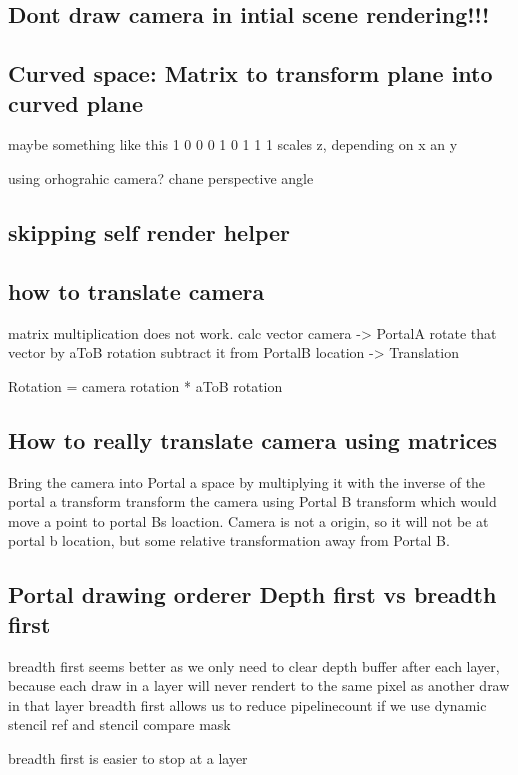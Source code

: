 \subsection{Dont draw camera in intial scene rendering!!!}

\subsection{ Curved space: Matrix to transform plane into curved plane}
maybe something like this
1 0 0
0 1 0
1 1 1
scales z, depending on x an y

using orhograhic camera?
chane perspective angle


\subsection{skipping self render helper}
\subsection{how to translate camera}
matrix multiplication does not work.
calc vector camera -> PortalA
rotate that vector by aToB rotation
subtract it from PortalB location
-> Translation

Rotation = camera rotation * aToB rotation

\subsection{How to really translate camera using matrices}
Bring the camera into Portal a space by multiplying it with the inverse of the portal a transform
transform the camera using Portal B transform which would move a point to portal Bs loaction. Camera is not a origin, so it will not be at portal b location, but some relative transformation away from Portal B.




\subsection{Portal drawing orderer Depth first vs breadth first}

breadth first seems better as we only need to clear depth buffer after each layer, because
each draw in a layer will never rendert to the same pixel as another draw in that layer
breadth first allows us to reduce pipelinecount if we use dynamic stencil ref and stencil compare mask

breadth first is easier to stop at a layer

